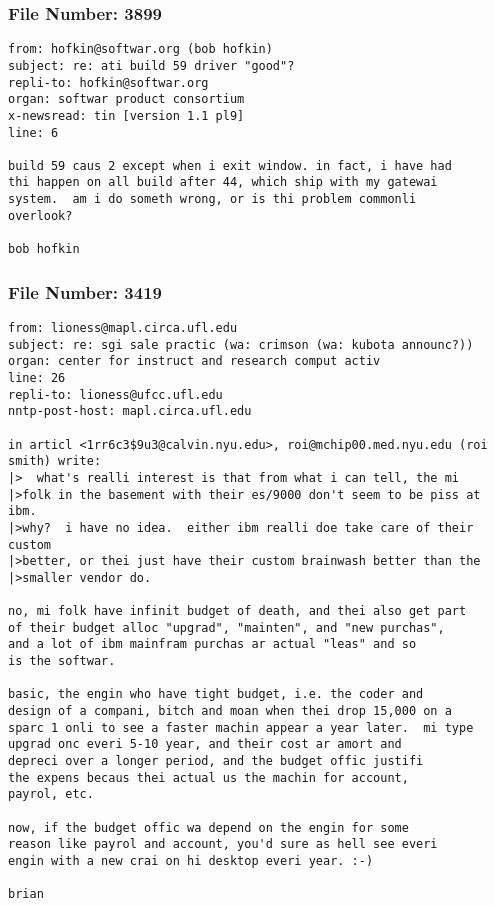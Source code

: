 \subsubsection*{File Number: 3899}
\scriptsize\begin{verbatim}
from: hofkin@softwar.org (bob hofkin)
subject: re: ati build 59 driver "good"?
repli-to: hofkin@softwar.org
organ: softwar product consortium
x-newsread: tin [version 1.1 pl9]
line: 6

build 59 caus 2 except when i exit window. in fact, i have had
thi happen on all build after 44, which ship with my gatewai
system.  am i do someth wrong, or is thi problem commonli
overlook?

bob hofkin
\end{verbatim}
\subsubsection*{File Number: 3419}
\scriptsize\begin{verbatim}
from: lioness@mapl.circa.ufl.edu
subject: re: sgi sale practic (wa: crimson (wa: kubota announc?))
organ: center for instruct and research comput activ
line: 26
repli-to: lioness@ufcc.ufl.edu
nntp-post-host: mapl.circa.ufl.edu

in articl <1rr6c3$9u3@calvin.nyu.edu>, roi@mchip00.med.nyu.edu (roi smith) write:
|>	what's realli interest is that from what i can tell, the mi
|>folk in the basement with their es/9000 don't seem to be piss at ibm.
|>why?  i have no idea.  either ibm realli doe take care of their custom
|>better, or thei just have their custom brainwash better than the
|>smaller vendor do.

no, mi folk have infinit budget of death, and thei also get part
of their budget alloc "upgrad", "mainten", and "new purchas",
and a lot of ibm mainfram purchas ar actual "leas" and so
is the softwar.

basic, the engin who have tight budget, i.e. the coder and
design of a compani, bitch and moan when thei drop 15,000 on a 
sparc 1 onli to see a faster machin appear a year later.  mi type
upgrad onc everi 5-10 year, and their cost ar amort and
depreci over a longer period, and the budget offic justifi
the expens becaus thei actual us the machin for account,
payrol, etc.

now, if the budget offic wa depend on the engin for some
reason like payrol and account, you'd sure as hell see everi
engin with a new crai on hi desktop everi year. :-)

brian

\end{verbatim}
